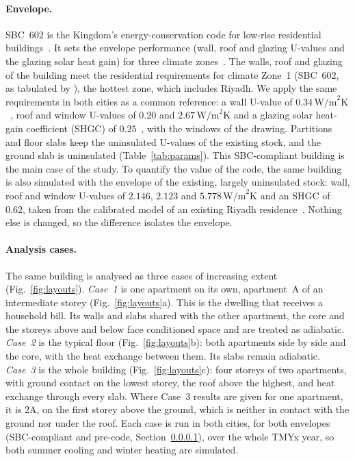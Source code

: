 \documentclass[10pt,a4paper,twocolumn]{article}
\theoremstyle{definition}
\begin{document}
\paragraph{Envelope.}\label{sec:stock} SBC~602 is the Kingdom's energy-conservation code for low-rise residential buildings~\citep{sbc602_2018}. It sets the envelope performance (wall, roof and glazing U-values and the glazing solar heat gain) for three climate zones~\citep{alayed2021thermal,stockmodel2020}. The walls, roof and glazing of the building meet the residential requirements for climate Zone~1 (SBC~602, as tabulated by \citet{stockmodel2020}), the hottest zone, which includes Riyadh. We apply the same requirements in both cities as a common reference: a wall U-value of $0.34\,\text{W/m}^2\text{K}$~\citep{sbc602_2018,alayed2021thermal,stockmodel2020}, roof and window U-values of $0.20$ and $2.67\,\text{W/m}^2\text{K}$ and a glazing solar heat-gain coefficient (SHGC) of $0.25$~\citep{stockmodel2020}, with the windows of the drawing. Partitions and floor slabs keep the uninsulated U-values of the existing stock, and the ground slab is uninsulated (Table~\ref{tab:params}). This SBC-compliant building is the main case of the study. To quantify the value of the code, the same building is also simulated with the envelope of the existing, largely uninsulated stock: wall, roof and window U-values of $2.146$, $2.123$ and $5.778\,\text{W/m}^2\text{K}$ and an SHGC of $0.62$, taken from the calibrated model of an existing Riyadh residence~\citep{alyami2021building}. Nothing else is changed, so the difference isolates the envelope.

\paragraph{Analysis cases.}\label{sec:steps} The same building is analysed as three cases of increasing extent (Fig.~\ref{fig:layouts}). \emph{Case~1} is one apartment on its own, apartment~A of an intermediate storey (Fig.~\ref{fig:layouts}a). This is the dwelling that receives a household bill. Its walls and slabs shared with the other apartment, the core and the storeys above and below face conditioned space and are treated as adiabatic. \emph{Case~2} is the typical floor (Fig.~\ref{fig:layouts}b): both apartments side by side and the core, with the heat exchange between them. Its slabs remain adiabatic. \emph{Case~3} is the whole building (Fig.~\ref{fig:layouts}c): four storeys of two apartments, with ground contact on the lowest storey, the roof above the highest, and heat exchange through every slab. Where Case~3 results are given for one apartment, it is 2A, on the first storey above the ground, which is neither in contact with the ground nor under the roof. Each case is run in both cities, for both envelopes (SBC-compliant and pre-code, Section~\ref{sec:stock}), over the whole TMYx year, so both summer cooling and winter heating are simulated.
\end{document}
